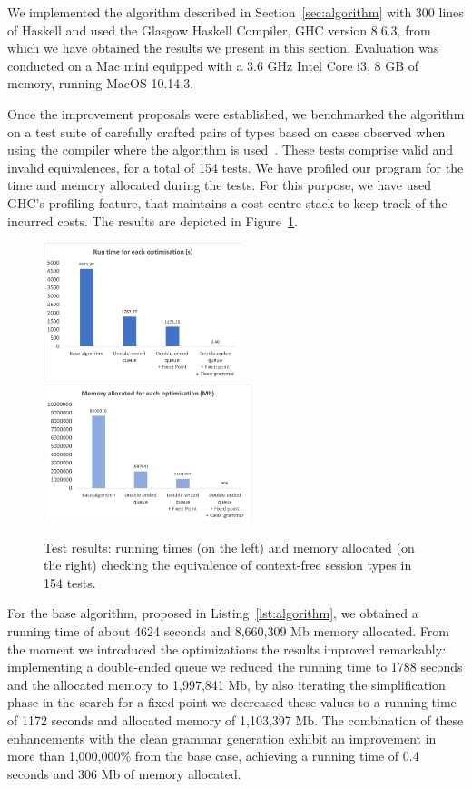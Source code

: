 We implemented the algorithm described in Section~\ref{sec:algorithm}
with 300 lines of Haskell and used the Glasgow Haskell Compiler, GHC
version 8.6.3, from which we have obtained the results we present in
this section.  Evaluation was conducted on a Mac mini equipped with a
3.6 GHz Intel Core i3, 8 GB of memory, running MacOS 10.14.3. 

Once the improvement proposals were established, we benchmarked the
algorithm on a test suite of carefully crafted pairs of types
based on cases observed when using the compiler where the algorithm is 
used~\cite{almeida.etal_freest-functional-language}. These
tests comprise valid and invalid equivalences, for a total of 154
tests. We have profiled our program for the time and memory allocated
during the tests. For this purpose, we have used GHC's profiling
feature, that maintains a cost-centre stack to keep track of the
incurred costs. The results are depicted in
Figure~\ref{fig:results}.

\begin{figure}[h]
	\includegraphics[height=4cm]{img/run_time}	\hspace*{2mm}
	\includegraphics[height=4cm]{img/memory_alloc}
	\caption{Test results: running times (on the left) and
	memory allocated (on the right) checking the equivalence
	of context-free session types in 154 tests.}
	\label{fig:results}
\end{figure}

For the base algorithm, proposed in Listing~\ref{lst:algorithm}, we
obtained a running time of about 4624 seconds and
8,660,309 Mb memory allocated. From the moment we introduced the
optimizations the results improved remarkably: 
implementing a double-ended queue we reduced the running time to 1788 
seconds and the allocated memory to 1,997,841 Mb, by also
iterating the
simplification phase in the search for a fixed point we decreased these values
to a running time of 1172 seconds and 
allocated memory of 1,103,397 Mb. The 
combination of these enhancements with the clean grammar generation
exhibit an improvement in more than 1,000,000\% from the base case,
achieving a running time of 0.4 seconds and 306 Mb 
of memory allocated.

